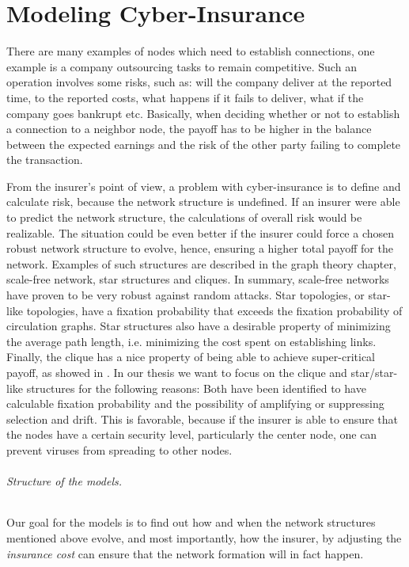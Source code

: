 \chapter{Modeling Cyber-Insurance }
\label{chp:modelingCyberInsurance} 

There are many examples of nodes which need to establish connections, one example is a company outsourcing tasks to remain competitive. Such an operation involves some risks, such as: will the company deliver at the reported time, to the reported costs, what happens if it fails to deliver, what if the company goes bankrupt etc. Basically, when deciding whether or not to establish a connection to a neighbor node, the payoff has to be higher in the balance between the expected earnings and the risk of the other party failing to complete the transaction.

From the insurer's point of view, a problem with cyber-insurance is to define and calculate risk, because the network structure is undefined. If an insurer were able to predict the network structure, the calculations of overall risk would be realizable. The situation could be even better if the insurer could force a chosen robust network structure to evolve, hence, ensuring a higher total payoff for the network.
Examples of such structures are described in the graph theory chapter, scale-free network, star structures and cliques. In summary, scale-free networks have proven to be very robust against random attacks. Star topologies, or star-like topologies, have a fixation probability that exceeds the fixation probability of circulation graphs. Star structures also have a desirable property of minimizing the average path length, i.e. minimizing the cost spent on establishing links. Finally, the clique has a nice property of being able to achieve super-critical payoff, as showed in \cite{contagion}.
In our thesis we want to focus on the clique and star/star-like structures for the following reasons: Both have been identified to have calculable fixation probability and the possibility of amplifying or suppressing selection and drift. This is favorable, because if the insurer is able to ensure that the nodes have a certain security level, particularly the center node, one can prevent viruses from spreading to other nodes.
 
\subparagraph{Structure of the models.} Our goal for the models is to find out how and when the network structures mentioned above evolve, and most importantly, how the insurer, by adjusting the \textit{insurance cost} can ensure that the network formation will in fact happen.

